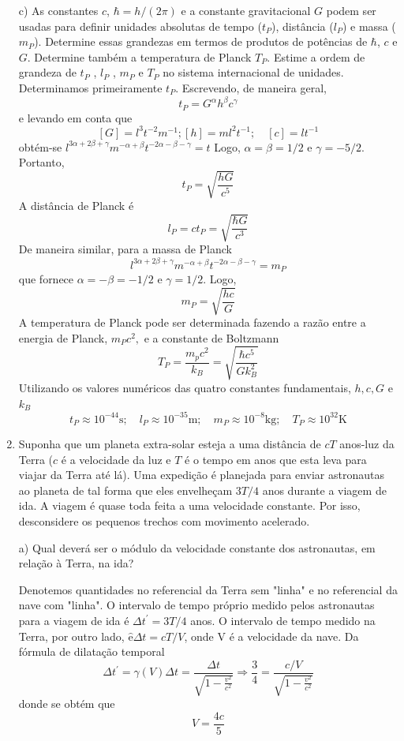 \begin{enumerate}[start=1,label={\bfseries Q\arabic*.}]
c) As constantes $c$, $\hbar = h/(2\pi)$ e a constante gravitacional $G$ podem ser usadas para definir unidades absolutas de tempo ($t_{P}$), distância ($l_{P}$) e massa ($m_{P}$). Determine essas grandezas em termos de produtos de potências de $\hbar$, $c$ e $G$. Determine também a temperatura de Planck $T_{P}$. Estime a ordem de grandeza de $t_{P}$ , $l_{P}$ , $m_{P}$ e $T_{P}$ no sistema internacional de unidades.
\resposta Determinamos primeiramente $t_{P} .$ Escrevendo, de maneira geral,
$$
t_{P}=G^{\alpha} h^{\beta} c^{\gamma}
$$
e levando em conta que
$$
[G]=l^{3} t^{-2} m^{-1} ;[h]=m l^{2} t^{-1} ; \quad[c]=l t^{-1}
$$
obtém-se $l^{3 \alpha+2 \beta+\gamma} m^{-\alpha+\beta} t^{-2 \alpha-\beta-\gamma}=t$
Logo, $\alpha=\beta=1 / 2$ e $\gamma=-5 / 2 .$ Portanto,
$$
t_{P}=\sqrt{\frac{h G}{c^{5}}}
$$
A distância de Planck é
$$
l_{P}=c t_{P}=\sqrt{\frac{\hbar G}{c^{3}}}
$$
De maneira similar, para a massa de Planck
$$
l^{3 \alpha+2 \beta+\gamma} m^{-\alpha+\beta} t^{-2 \alpha-\beta-\gamma}=m_{P}
$$
que fornece $\alpha=-\beta=-1 / 2$ e $\gamma=1 / 2 .$ Logo,
$$
m_{P}=\sqrt{\frac{h c}{G}}
$$
A temperatura de Planck pode ser determinada fazendo a razão entre a energia de Planck, $m_{P} c^{2},$ e a constante de Boltzmann
$$
T_{P}=\frac{m_{p} c^{2}}{k_{B}}=\sqrt{\frac{\hbar c^{5}}{G k_{B}^{2}}}
$$
Utilizando os valores numéricos das quatro constantes fundamentais, $h, c, G$ e $k_{B}$
$$
t_{P} \approx 10^{-44} \mathrm{s} ; \quad l_{P} \approx 10^{-35} \mathrm{m} ; \quad m_{P} \approx 10^{-8} \mathrm{kg} ; \quad T_{P} \approx 10^{32} \mathrm{K}
$$





\item Suponha que um planeta extra-solar esteja a uma distância de $c T$ anos-luz da Terra ($c$ é a velocidade da luz e $T$ é o tempo em anos que esta leva para viajar da Terra até lá). Uma expedição é planejada para enviar astronautas ao planeta de tal forma que eles envelheçam $3T/4$ anos durante a viagem de ida. A viagem é quase toda feita a uma velocidade constante. Por isso, desconsidere os pequenos trechos com movimento acelerado.



a) Qual deverá ser o módulo da velocidade constante dos astronautas, em relação à Terra, na ida?

\resposta Denotemos quantidades no referencial da Terra sem "linha" e no referencial da nave com "linha". O intervalo de tempo próprio medido pelos astronautas para a viagem de ida é $\Delta t^{\prime}=3 T / 4$ anos. $\mathrm{O}$ intervalo de tempo medido na Terra, por outro lado, $\hat{\mathrm{e}} \Delta t=c T / V$, onde
V é a velocidade da nave. Da fórmula de dilatação temporal
$$
\Delta t^{\prime}=\gamma(V) \Delta t=\frac{\Delta t}{\sqrt{1-\frac{v^{2}}{c^{2}}}} \Rightarrow \frac{3}{4}=\frac{c / V}{\sqrt{1-\frac{v^{2}}{c^{2}}}}
$$
donde se obtém que
$$
V=\frac{4 c}{5}
$$





\end{enumerate}
